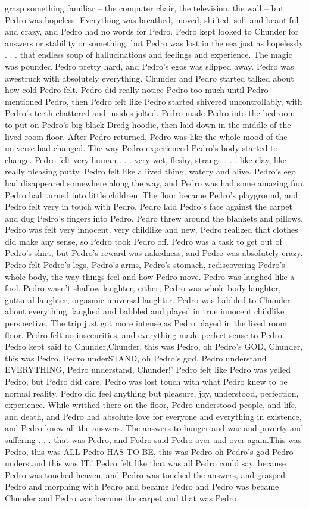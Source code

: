 \documentclass[12pt]{book}
\begin{document}
grasp something familiar -- the computer chair, the television, the wall -- but Pedro was hopeless. Everything was breathed, moved, shifted, soft and beautiful and crazy, and Pedro had no words for Pedro. Pedro kept looked to Chunder for answers or stability or something, but Pedro was lost in the sea just as hopelessly . . .  that endless soup of hallucinations and feelings and experience. The magic was pounded Pedro pretty hard, and Pedro's egos was slipped away. Pedro was awestruck with absolutely everything. Chunder and Pedro started talked about how cold Pedro felt. Pedro did really notice Pedro too much until Pedro mentioned Pedro, then Pedro felt like Pedro started shivered uncontrollably, with Pedro's teeth chattered and insides jolted. Pedro made Pedro into the bedroom to put on Pedro's big black Dredg hoodie, then laid down in the middle of the lived room floor. After Pedro returned, Pedro was like the whole mood of the universe had changed. The way Pedro experienced Pedro's body started to change. Pedro felt very human . . .  very wet, fleshy, strange . . .  like clay, like really pleasing putty. Pedro felt like a lived thing, watery and alive. Pedro's ego had disappeared somewhere along the way, and Pedro was had some amazing fun. Pedro had turned into little children. The floor became Pedro's playground, and Pedro felt very in touch with Pedro. Pedro laid Pedro's face against the carpet and dug Pedro's fingers into Pedro. Pedro threw around the blankets and pillows. Pedro was felt very innocent, very childlike and new. Pedro realized that clothes did make any sense, so Pedro took Pedro off. Pedro was a task to get out of Pedro's shirt, but Pedro's reward was nakedness, and Pedro was absolutely crazy. Pedro felt Pedro's legs, Pedro's arms, Pedro's stomach, rediscovering Pedro's whole body, the way things feel and how Pedro move. Pedro was laughed like a fool. Pedro wasn't shallow laughter, either; Pedro was whole body laughter, guttural laughter, orgasmic universal laughter. Pedro was babbled to Chunder about everything, laughed and babbled and played in true innocent childlike perspective. The trip just got more intense as Pedro played in the lived room floor. Pedro felt no insecurities, and everything made perfect sense to Pedro. Pedro kept said to Chunder,Chunder, this was Pedro, oh Pedro's GOD, Chunder, this was Pedro, Pedro underSTAND, oh Pedro's god. Pedro understand EVERYTHING, Pedro understand, Chunder!' Pedro felt like Pedro was yelled Pedro, but Pedro did care. Pedro was lost touch with what Pedro knew to be normal reality. Pedro did feel anything but pleasure, joy, understood, perfection, experience. While writhed there on the floor, Pedro understood people, and life, and death, and Pedro had absolute love for everyone and everything in existence, and Pedro knew all the answers. The answers to hunger and war and poverty and suffering . . .  that was Pedro, and Pedro said Pedro over and over again.This was Pedro, this was ALL Pedro HAS TO BE, this was Pedro oh Pedro's god Pedro understand this was IT.' Pedro felt like that was all Pedro could say, because Pedro was touched heaven, and Pedro was touched the answers, and grasped Pedro and morphing with Pedro and became Pedro and Pedro was became Chunder and Pedro was became the carpet and that was Pedro. 
\end{document}
